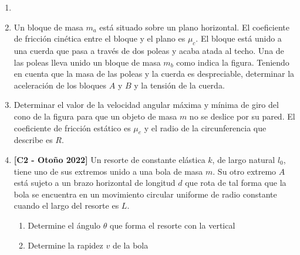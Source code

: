 \documentclass[letterpaper,11pt]{article}
\begin{document}
\vspace{-1cm}
\begin{enumerate}\setlength{\itemsep}{0.4cm}

\item[]

\item Un bloque de masa $m_a$ está situado sobre un plano horizontal. El coeficiente de fricción cinética entre el bloque y el plano es $\mu_c$. El bloque está unido a una cuerda que pasa a través de dos poleas y acaba atada al techo. Una de las poleas lleva unido un bloque de masa $m_b$ como indica la figura. Teniendo en cuenta que la masa de las poleas y la cuerda es despreciable, determinar la aceleración de los bloques $A$ y $B$ y la tensión de la cuerda.

    \begin{figure}[H]
        \centering
        
    \end{figure}

\newpage
\item Determinar el valor de la velocidad angular máxima y mínima de giro del cono de la figura para que un objeto de masa $m$ no se deslice por su pared. El coeficiente de fricción estático es $\mu_e$ y el radio de la circunferencia que describe es $R$.

        

    \begin{figure}[H]
        \centering
        
    \end{figure}
    
    

\item \textbf{[C2 - Otoño 2022]} Un resorte de constante elástica $k$, de largo natural $l_0$, tiene uno
de sus extremos unido a una bola de masa $m$. Su otro extremo $A$ está sujeto a un
brazo horizontal de longitud $d$ que rota de tal forma que la bola se encuentra en un
movimiento circular uniforme de radio constante cuando el largo del resorte es $L$.

\begin{enumerate}
    \item Determine el ángulo $\theta$ que forma el resorte con la vertical
    \item Determine la rapidez $v$ de la bola
\end{enumerate}



\end{enumerate}
\end{document}
